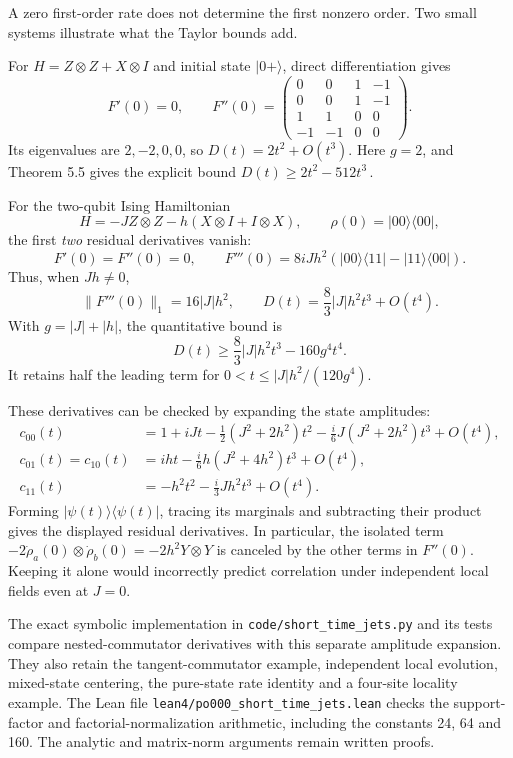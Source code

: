 \documentclass[
  11pt,
]{article}
\begin{document}
A zero first-order rate does not determine the first nonzero order.
Two small systems illustrate what the Taylor bounds add.

For \(H=Z\otimes Z+X\otimes I\) and initial state \(|0+\rangle\),
direct differentiation gives
\[
 F'(0)=0,\qquad
 F''(0)=
 \begin{pmatrix}
 0&0&1&-1\\
 0&0&1&-1\\
 1&1&0&0\\
 -1&-1&0&0
 \end{pmatrix}.
\]
Its eigenvalues are \(2,-2,0,0\), so
\(D(t)=2t^2+O(t^3)\). Here \(g=2\), and Theorem 5.5 gives the explicit
bound \(D(t)\ge 2t^2-512t^3\,\).

For the two-qubit Ising Hamiltonian
\[
 H=-JZ\otimes Z-h(X\otimes I+I\otimes X),\qquad
 \rho(0)=|00\rangle\langle00|,
\]
the first \emph{two} residual derivatives vanish:
\[
 F'(0)=F''(0)=0,\qquad
 F'''(0)=8iJh^2
       (|00\rangle\langle11|-|11\rangle\langle00|).
\]
Thus, when \(Jh\ne0\),
\[
 \lVert F'''(0)\rVert_1=16|J|h^2,\qquad
 D(t)=\frac{8}{3}|J|h^2t^3+O(t^4).
\]
With \(g=|J|+|h|\), the quantitative bound is
\[
 D(t)\geq\frac{8}{3}|J|h^2t^3-160g^4t^4.
\]
It retains half the leading term for
\(0<t\leq |J|h^2/(120g^4)\).

These derivatives can be checked by expanding the state amplitudes:
\[
 \begin{aligned}
 c_{00}(t)&=1+iJt-\tfrac12(J^2+2h^2)t^2
              -\tfrac{i}{6}J(J^2+2h^2)t^3+O(t^4),\\
 c_{01}(t)=c_{10}(t)&=iht-\tfrac{i}{6}h(J^2+4h^2)t^3+O(t^4),\\
 c_{11}(t)&=-h^2t^2-\tfrac{i}{3}Jh^2t^3+O(t^4).
 \end{aligned}
\]
Forming \(|\psi(t)\rangle\langle\psi(t)|\), tracing its marginals and
subtracting their product gives the displayed residual derivatives.
In particular, the isolated term
\(-2\dot\rho_a(0)\otimes\dot\rho_b(0)=-2h^2Y\otimes Y\) is canceled
by the other terms in \(F''(0)\). Keeping it alone would incorrectly
predict correlation under independent local fields even at \(J=0\).

The exact symbolic implementation in \texttt{code/short\_time\_jets.py} and its
tests compare nested-commutator derivatives with this separate amplitude
expansion. They also retain the tangent-commutator example, independent
local evolution, mixed-state centering, the pure-state rate identity and
a four-site locality example. The Lean file
\texttt{lean4/po000\_short\_time\_jets.lean} checks the support-factor and
factorial-normalization arithmetic, including the constants 24, 64 and
160. The analytic and matrix-norm arguments remain written proofs.
\end{document}

